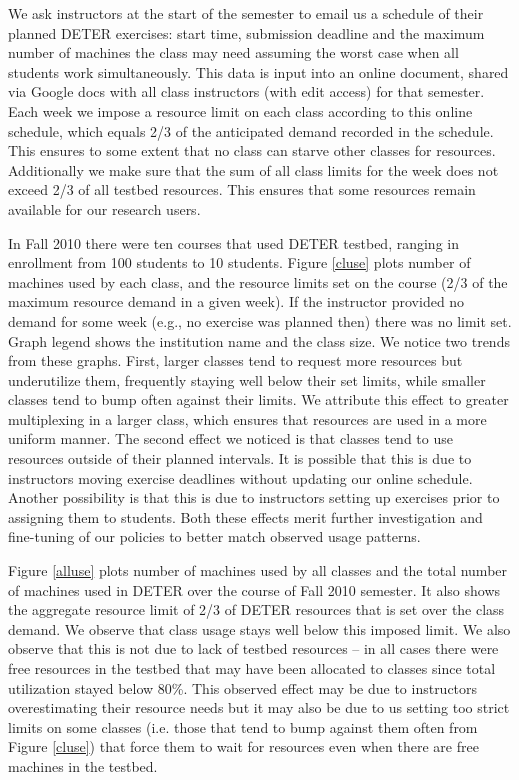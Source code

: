 \documentclass[12pt]{article}
\begin{document}
We ask instructors at the start of the semester to email us a schedule
of their planned DETER exercises: start time, submission deadline and
the maximum number of machines the class may need assuming the worst
case when all students work simultaneously. This data is input into an
online document, shared via Google docs with all class instructors (with
edit access) for that semester. Each week we impose a resource limit on
each class according to this online schedule, which equals 2/3 of the
anticipated demand recorded in the schedule. This ensures to some extent that no class can starve
other classes for resources. Additionally we make sure that the sum of
all class limits for the week does not exceed 2/3 of all testbed
resources. This ensures that some resources remain available for our
research users.

In Fall 2010 there were ten courses that used DETER testbed, ranging in
enrollment from 100 students to 10 students. Figure \ref{cluse} plots
number of machines used by each class, and the resource limits set on
the course (2/3 of the maximum resource demand in a given week). If the
instructor provided no demand for some week (e.g., no exercise was
planned then) there was no limit set. Graph legend shows the institution
name and the class size. We notice two trends from these graphs. First,
larger classes tend to request more resources but underutilize them,
frequently staying well below their set limits, while smaller classes
tend to bump often against their limits. We attribute this effect to
greater multiplexing in a larger class, which ensures that resources are
used in a more uniform manner. The second effect we noticed is that
classes tend to use resources outside of their planned intervals. It is
possible that this is due to instructors moving exercise deadlines
without updating our online schedule. Another possibility is that this
is due to instructors setting up exercises prior to assigning them to
students. Both these effects merit further investigation and fine-tuning
of our policies to better match observed usage patterns.

Figure \ref{alluse} plots number of machines used by all classes and the
total number of machines used in DETER over the course of Fall 2010
semester. It also shows the aggregate resource limit of 2/3 of DETER
resources that is set over the class demand. We observe that class usage
stays well below this imposed limit. We also observe that this is not
due to lack of testbed resources -- in all cases there were free
resources in the testbed that may have been allocated to classes since
total utilization stayed below 80\%. This observed effect may be due to
instructors overestimating their resource needs but it may also be due
to us setting too strict limits on some classes (i.e. those that tend to
bump against them often from Figure \ref{cluse}) that force them to wait for
resources even when there are free machines in the testbed.
\end{document}
